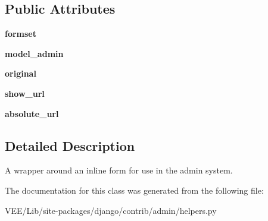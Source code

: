 \subsection*{Public Attributes}
\begin{DoxyCompactItemize}
\item 
\mbox{\label{classdjango_1_1contrib_1_1admin_1_1helpers_1_1_inline_admin_form_ac45b8dc3a2aa138541f1e782dbf5ef5b}} 
{\bfseries formset}
\item 
\mbox{\label{classdjango_1_1contrib_1_1admin_1_1helpers_1_1_inline_admin_form_a32ba6d21ec8c700979325d6b31fd5fe2}} 
{\bfseries model\+\_\+admin}
\item 
\mbox{\label{classdjango_1_1contrib_1_1admin_1_1helpers_1_1_inline_admin_form_a1a88db99ae3833257c6c76b3ae85346b}} 
{\bfseries original}
\item 
\mbox{\label{classdjango_1_1contrib_1_1admin_1_1helpers_1_1_inline_admin_form_acec92414468f2a5f7d2a681cc558cdd7}} 
{\bfseries show\+\_\+url}
\item 
\mbox{\label{classdjango_1_1contrib_1_1admin_1_1helpers_1_1_inline_admin_form_add07d9111c8ea3189813ffed4b921d81}} 
{\bfseries absolute\+\_\+url}
\end{DoxyCompactItemize}


\subsection{Detailed Description}
\begin{DoxyVerb}A wrapper around an inline form for use in the admin system.
\end{DoxyVerb}
 

The documentation for this class was generated from the following file\+:\begin{DoxyCompactItemize}
\item 
V\+E\+E/\+Lib/site-\/packages/django/contrib/admin/helpers.\+py\end{DoxyCompactItemize}
